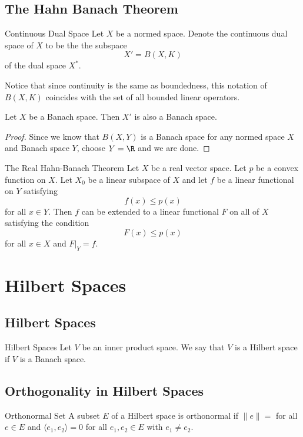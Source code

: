 \documentclass[a4paper]{article}
\begin{document}
\subsection{The Hahn Banach Theorem}
\begin{defn}{Continuous Dual Space}{} Let $X$ be a normed space. Denote the continuous dual space of $X$ to be the the subspace $$X'=B(X,K)$$ of the dual space $X^\ast$. 
\end{defn}

Notice that since continuity is the same as boundedness, this notation of $B(X,K)$ coincides with the set of all bounded linear operators. 

\begin{lmm}{}{} Let $X$ be a Banach space. Then $X'$ is also a Banach space. \tcbline
\begin{proof}
Since we know that $B(X,Y)$ is a Banach space for any normed space $X$ and Banach space $Y$, choose $Y=\R$ and we are done. 
\end{proof}
\end{lmm}

\begin{thm}{The Real Hahn-Banach Theorem}{} Let $X$ be a real vector space. Let $p$ be a convex function on $X$. Let $X_0$ be a linear subspace of $X$ and let $f$ be a linear functional on $Y$ satisfying $$f(x)\leq p(x)$$ for all $x\in Y$. Then $f$ can be extended to a linear functional $F$ on all of $X$ satisfying the condition $$F(x)\leq p(x)$$ for all $x\in X$ and $F|_Y=f$. 
\end{thm}

\pagebreak
\section{Hilbert Spaces}
\subsection{Hilbert Spaces}
\begin{defn}{Hilbert Spaces}{} Let $V$ be an inner product space. We say that $V$ is a Hilbert space if $V$ is a Banach space. 
\end{defn}

\subsection{Orthogonality in Hilbert Spaces}
\begin{defn}{Orthonormal Set}{} A subset $E$ of a Hilbert space is orthonormal if $\|e\|=$ for all $e\in E$ and $\langle e_1,e_2\rangle=0$ for all $e_1,e_2\in E$ with $e_1\neq e_2$. 
\end{defn}
\end{document}
